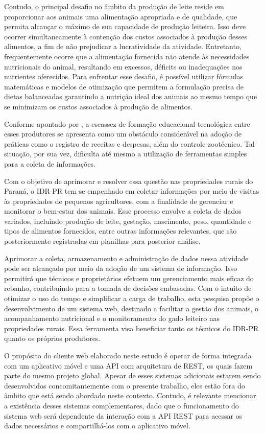 Contudo, o principal desafio no âmbito da produção de leite reside em proporcionar aos animais uma alimentação apropriada e de qualidade, que permita alcançar o máximo de sua capacidade de produção leiteira. Isso deve ocorrer simultaneamente à contenção dos custos associados à produção desses alimentos, a fim de não prejudicar a lucratividade da atividade. Entretanto, frequentemente ocorre que a alimentação fornecida não atende às necessidades nutricionais do animal, resultando em excessos, déficits ou inadequações nos nutrientes oferecidos. Para enfrentar esse desafio, é possível utilizar fórmulas matemáticas e modelos de otimização que permitem a formulação precisa de dietas balanceadas garantindo a nutrição ideal dos animais ao mesmo tempo que se minimizam os custos associados à produção de alimentos.

Conforme apontado por , a escassez de formação educacional tecnológica entre esses produtores se apresenta como um obstáculo considerável na adoção de práticas como o registro de receitas e despesas, além do controle zootécnico. Tal situação, por sua vez, dificulta até mesmo a utilização de ferramentas simples para a coleta de informações.

Com o objetivo de aprimorar e resolver essa questão nas propriedades rurais do Paraná, o \gls{IDR-PR} tem se empenhado em coletar informações por meio de visitas às propriedades de pequenos agricultores, com a finalidade de gerenciar e monitorar o bem-estar dos animais. Esse processo envolve a coleta de dados variados, incluindo produção de leite, gestação, nascimento, peso, quantidade e tipos de alimentos fornecidos, entre outras informações relevantes, que são posteriormente registradas em planilhas para posterior análise.

Aprimorar a coleta, armazenamento e administração de dados nessa atividade pode ser alcançado por meio da adoção de um sistema de informação. Isso permitirá que técnicos e proprietários efetuem um gerenciamento mais eficaz do rebanho, contribuindo para a tomada de decisões embasadas. Com o intuito de otimizar o uso do tempo e simplificar a carga de trabalho, esta pesquisa propõe o desenvolvimento de um sistema web, destinado a facilitar a gestão dos animais, o acompanhamento nutricional e o monitoramento do gado leiteiro nas propriedades rurais. Essa ferramenta visa beneficiar tanto os técnicos do \gls{IDR-PR} quanto os próprios produtores.

O propósito do cliente web elaborado neste estudo é operar de forma integrada com um aplicativo móvel e uma \gls{API} com arquitetura de \gls{REST}, os quais fazem parte do mesmo projeto global. Apesar de esses sistemas adicionais estarem sendo desenvolvidos concomitantemente com o presente trabalho, eles estão fora do âmbito que está sendo abordado neste contexto. Contudo, é relevante mencionar a existência desses sistemas complementares, dado que o funcionamento do sistema web será dependente da interação com a \gls{API} \gls{REST} para acessar os dados necessários e compartilhá-los com o aplicativo móvel.

